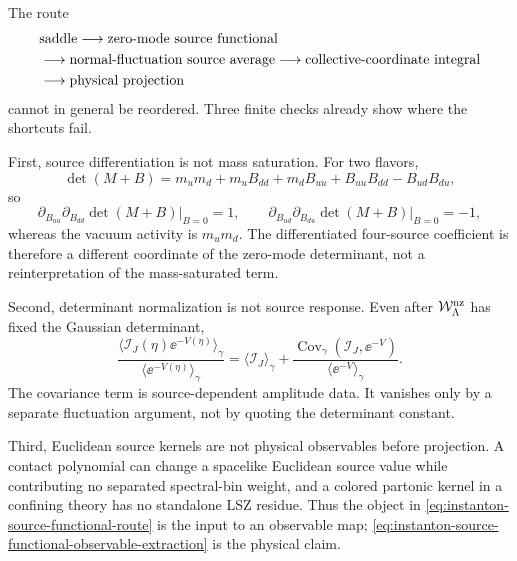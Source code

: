 \begin{construction}
\label{constr:instanton-source-functional-route}
The route
\[
\begin{aligned}
  &\hbox{saddle}
  \longrightarrow
  \hbox{zero-mode source functional}                         \\
  &\longrightarrow
  \hbox{normal-fluctuation source average}
  \longrightarrow
  \hbox{collective-coordinate integral}                       \\
  &\longrightarrow
  \hbox{physical projection}
\end{aligned}
\]
cannot in general be reordered.  Three finite checks already show where the
shortcuts fail.

First, source differentiation is not mass saturation.  For two flavors,
\[
  \det(M+B)
  =
  m_um_d+m_uB_{dd}+m_dB_{uu}+B_{uu}B_{dd}-B_{ud}B_{du},
\]
so
\[
  \partial_{B_{uu}}\partial_{B_{dd}}\det(M+B)\big|_{B=0}=1,
  \qquad
  \partial_{B_{ud}}\partial_{B_{du}}\det(M+B)\big|_{B=0}=-1,
\]
whereas the vacuum activity is \(m_um_d\).  The differentiated
four-source coefficient is therefore a different coordinate of the
zero-mode determinant, not a reinterpretation of the mass-saturated term.

Second, determinant normalization is not source response.  Even after
\(\mathcal W_{\Lambda}^{\rm nz}\) has fixed the Gaussian determinant,
\[
  \frac{\langle\mathcal I_J(\eta)\ee^{-V(\eta)}\rangle_\gamma}
       {\langle\ee^{-V(\eta)}\rangle_\gamma}
  =
  \langle\mathcal I_J\rangle_\gamma
  +
  \frac{
    \operatorname{Cov}_\gamma(\mathcal I_J,\ee^{-V})
  }{
    \langle\ee^{-V}\rangle_\gamma
  } .
\]
The covariance term is source-dependent amplitude data.  It vanishes only by
a separate fluctuation argument, not by quoting the determinant constant.

Third, Euclidean source kernels are not physical observables before
projection.  A contact polynomial can change a spacelike Euclidean source
value while contributing no separated spectral-bin weight, and a colored
partonic kernel in a confining theory has no standalone LSZ residue.  Thus
the object in \eqref{eq:instanton-source-functional-route} is the input to
an observable map; \eqref{eq:instanton-source-functional-observable-extraction}
is the physical claim.
\end{construction}

